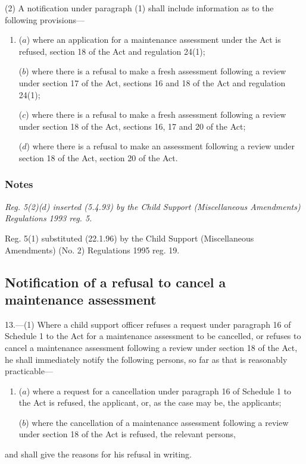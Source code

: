 \documentclass[a4paper]{article}
\newcommand\amendment[1]{\subsubsection*{Notes}{\itshape\frenchspacing\footnotesize #1 \par}}
\begin{document}
(2) A notification under paragraph (1) shall include information as to the following provisions—
\begin{enumerate}\item[]
($a$) where an application for a maintenance assessment under the Act is refused, section 18 of the Act and regulation 24(1);

($b$) where there is a refusal to make a fresh assessment following a review under section 17 of the Act, sections 16 and 18 of the Act and regulation 24(1);

($c$) where there is a refusal to make a fresh assessment following a review under section 18 of the Act, sections 16, 17 and 20 of the Act;

($d$) where there is a refusal to make an assessment following a review under section 18 of the Act, section 20 of the Act.
\end{enumerate}

\amendment{
Reg. 5(2)($d$) inserted (5.4.93) by the Child Support (Miscellaneous Amendments) Regulations 1993 reg. 5.

Reg. 5(1) substituted (22.1.96) by the Child Support (Miscellaneous Amendments) (No. 2) Regulations 1995 reg. 19.
}

\subsection[13. Notification of a refusal to cancel a maintenance assessment]{Notification of a refusal to cancel a maintenance assessment}

13.—(1) Where a child support officer refuses a request under paragraph 16 of Schedule 1 to the Act for a maintenance assessment to be cancelled, or refuses to cancel a maintenance assessment following a review under section 18 of the Act, he shall immediately notify the following persons, so far as that is reasonably practicable—
\begin{enumerate}\item[]
($a$) where a request for a cancellation under paragraph 16 of Schedule 1 to the Act is refused, the applicant, or, as the case may be, the applicants;

($b$) where the cancellation of a maintenance assessment following a review under section 18 of the Act is refused, the relevant persons,
\end{enumerate}
and shall give the reasons for his refusal in writing.
\end{document}
